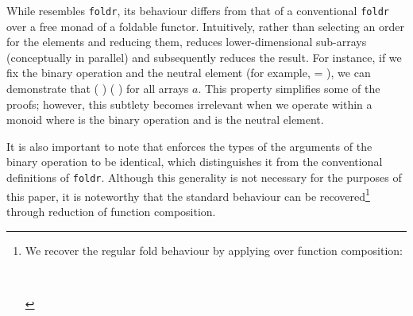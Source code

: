 While  resembles \texttt{foldr}, its behaviour differs from that of a
conventional \texttt{foldr} over a free monad of a foldable functor.
Intuitively, rather than
selecting an order for the elements and reducing them,  reduces
lower-dimensional sub-arrays (conceptually in parallel) and subsequently
reduces the result. For instance, if we fix the binary operation  and the
neutral element  (for example,  =   ), we can
demonstrate that  (  )   (
) for all arrays \(a\). This property simplifies some of the proofs;
however, this subtlety becomes irrelevant when we operate within a monoid where
 is the binary operation and  is the neutral element.

It is also important to note that  enforces the types of the arguments
of the binary operation to be identical, which distinguishes it from the
conventional definitions of \texttt{foldr}. Although this generality is not
necessary for the purposes of this paper, it is noteworthy that the standard
behaviour can be recovered\footnote{We recover the regular fold behaviour by
applying  over function composition:
\begin{code}%
%
\>[2]\AgdaSpace{}%
\AgdaSymbol{:}\AgdaSpace{}%
\AgdaSymbol{(}\AgdaSpace{}%
\AgdaSpace{}%
\AgdaSpace{}%
\AgdaSpace{}%
\AgdaSymbol{)}\AgdaSpace{}%
\AgdaSpace{}%
\AgdaSpace{}%
\AgdaSpace{}%
\AgdaSpace{}%
\AgdaSpace{}%
\AgdaSpace{}%
\AgdaSpace{}%
\<%
\\
%
\>[2]\AgdaSpace{}%
\AgdaSpace{}%
\AgdaSpace{}%
\AgdaSpace{}%
\AgdaSymbol{=}\AgdaSpace{}%
\AgdaSpace{}%
\AgdaSpace{}%
\AgdaSpace{}%
\AgdaSymbol{(}\AgdaSpace{}%
\AgdaSpace{}%
\AgdaSymbol{)}\AgdaSpace{}%
\<%
\end{code}
} through reduction of function composition.

